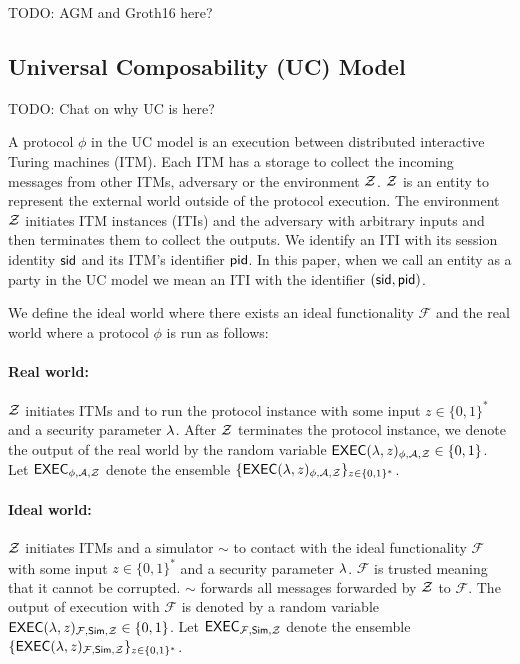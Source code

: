TODO: AGM and Groth16 here?


\subsection{Universal Composability (UC) Model}

TODO: Chat on why UC is here?

A protocol $ \phi $ in the UC model is an execution between distributed interactive Turing machines (ITM). Each ITM has a storage to collect the incoming messages from other ITMs, adversary \adv or the environment $ \mathcal{Z} $. $ \mathcal{Z} $ is an entity to represent the external world outside of the protocol execution.  The environment $ \mathcal{Z} $ initiates ITM instances (ITIs) and the adversary \adv with arbitrary inputs and then terminates them to collect the outputs.
We identify an ITI with its session identity $ \textsf{sid} $ and its ITM's identifier $ \textsf{pid} $. In this paper, when we call an entity as a party in the UC model we mean an ITI with the identifier $ (\textsf{sid}, \textsf{pid}) $.

We define the ideal world where there exists an ideal functionality $ \mathcal{F} $ and the real world where a protocol $ \phi $ is run as follows:

\paragraph{Real world:} $ \mathcal{Z} $ initiates ITMs and \adv to run the protocol instance with some input $ z \in \{0,1\}^* $  and a security parameter $ \lambda $. After $ \mathcal{Z} $ terminates the protocol instance, we denote the output of the real world by the random variable $ \mathsf{EXEC}(\lambda, z)_{\phi, \mathcal{A}, \mathcal{Z}} \in \{0,1\} $. Let $ \mathsf{EXEC}_{\phi, \mathcal{A}, \mathcal{Z}} $ denote the ensemble $ \{\mathsf{EXEC}(\lambda, z)_{\phi, \mathcal{A}, \mathcal{Z}} \}_{z \in \{0,1\}^*} $.

\paragraph{Ideal world:} $ \mathcal{Z} $ initiates ITMs and a simulator $ \sim $ to contact with the ideal functionality $ \mathcal{F} $ with some input $ z \in \{0,1\}^* $  and a security parameter $ \lambda $. $ \mathcal{F} $ is trusted meaning that it cannot be corrupted.
$ \sim $ forwards all messages forwarded by $ \mathcal{Z} $ to $ \mathcal{F} $. The output of execution with $ \mathcal{F} $ is denoted by a random variable $ \mathsf{EXEC}(\lambda, z)_{\mathcal{F},\mathsf{Sim}, \mathcal{Z}} \in \{0,1\}$.  Let $ \mathsf{EXEC}_{\mathcal{F},\mathsf{Sim}, \mathcal{Z}} $ denote the ensemble $ \{\mathsf{EXEC}(\lambda, z)_{\mathcal{F}, \mathsf{Sim}, \mathcal{Z}} \}_{z \in \{0,1\}^*} $.

